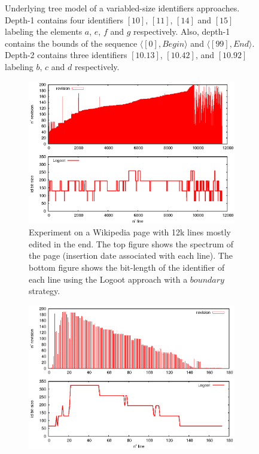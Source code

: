 \begin{figure}[h]
\begin{center}

\caption{Underlying tree model of a variabled-size identifiers approaches.
  Depth-1 contains four identifiers $[10]$, $[11]$, $[14]$ and $[15]$ labeling
  the elements $a$, $e$, $f$ and $g$ respectively. Also, depth-1 contains the
  bounds of the sequence $\langle [0], Begin \rangle$ and $\langle [99],End
  \rangle$. Depth-2 contains three identifiers $[10.13]$, $[10.42]$, and
  $[10.92]$ labeling $b$, $c$ and $d$ respectively.  }
\label{fig:treeexample}
\end{center}
\end{figure}


\begin{figure}
\centering
\begin{subfigure}[t]{0.47\textwidth}
  \includegraphics[width=\textwidth]{img/compliant.eps}
  \caption{Experiment on a Wikipedia page with 12k lines mostly edited in the
    end. The top figure shows the spectrum of the page (insertion date
    associated with each line). The bottom figure shows the bit-length of the
    identifier of each line using the Logoot approach with a $boundary$
    strategy.}
  \label{im:posteonlyblue}
\end{subfigure}
\begin{subfigure}[t]{0.47\textwidth}
\includegraphics[width=\textwidth]{img/motivating.eps}

\end{subfigure}
\end{figure}
